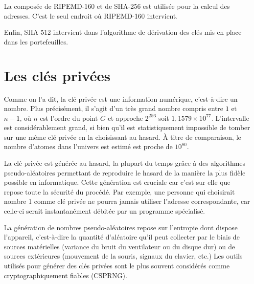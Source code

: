 La composée de RIPEMD-160 et de SHA-256 est utilisée pour la calcul des adresses. C'est le seul endroit où RIPEMD-160 intervient.

Enfin, SHA-512 intervient dans l'algorithme de dérivation des clés mis en place dans les portefeuilles.

\section{Les clés privées}

Comme on l'a dit, la clé privée est une information numérique, c'est-à-dire un nombre. Plus précisément, il s'agit d'un très grand nombre compris entre $1$ et $n-1$, où $n$ est l'ordre du point $G$ et approche $2^{256}$ soit $1,1579 \times 10^{77}$. L'intervalle est considérablement grand, si bien qu'il est statistiquement impossible de tomber sur une même clé privée en la choisissant au hasard. À titre de comparaison, le nombre d'atomes dans l'univers est estimé est proche de $10^{80}$. 


La clé privée est générée au hasard, la plupart du temps grâce à des algorithmes pseudo-aléatoires permettant de reproduire le hasard de la manière la plus fidèle possible en informatique. Cette génération est cruciale car c'est sur elle que repose toute la sécurité du procédé. Par exemple, une personne qui choisirait nombre 1 comme clé privée ne pourra jamais utiliser l'adresse correspondante, car celle-ci serait instantanément débitée par un programme spécialisé.

La génération de nombres pseudo-aléatoires repose sur l'entropie dont dispose l'appareil, c'est-à-dire la quantité d'aléatoire qu'il peut collecter par le biais de sources matérielles (variance du bruit du ventilateur ou du disque dur) ou de sources extérieures (mouvement de la souris, signaux du clavier, etc.) Les outils utilisés pour générer des clés privées sont le plus souvent considérés comme cryptographiquement fiables (CSPRNG).

